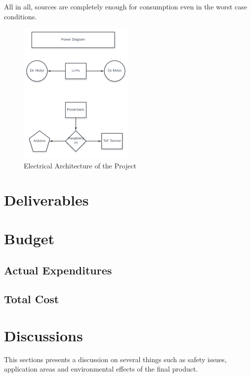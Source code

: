 \documentclass[a4paper,12pt]{article}
\begin{document}
All in all, sources are completely enough for consumption even in the worst case conditions.   


\begin{figure}[H]

\includegraphics[width=0.5\textwidth,center]{images/elec_arch}

\caption{Electrical Architecture of the Project}\label{fig:elec}

\end{figure}


\newpage
\section{Deliverables}
\section{Budget}
\subsection{Actual Expenditures}
\subsection{Total Cost}
\section{Discussions}
This sections presents a discussion on several things such as safety issues, application areas and environmental effects of the final product.
\end{document}
